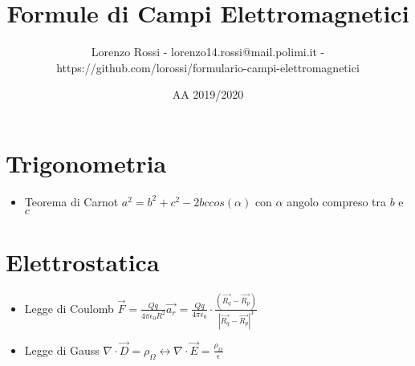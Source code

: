 \documentclass{article}
\title{Formule di Campi Elettromagnetici}
\author{Lorenzo Rossi - lorenzo14.rossi@mail.polimi.it - https://github.com/lorossi/formulario-campi-elettromagnetici}
\date{AA 2019/2020}
\begin{document}
\maketitle

\section{Trigonometria}
\begin{itemize}
	\item Teorema di Carnot \( a^2 = b^2 + c^2 - 2bccos(\alpha)\) con \(\alpha\) angolo compreso tra \(b\) e \(c\) 
\end{itemize}

\section{Elettrostatica}
\begin{itemize}
	\item Legge di Coulomb \( \vec{F} = \frac{Qq}{4 \pi \epsilon_0 R^2} \vec{a_r} = \frac{Qq}{4 \pi \epsilon_0} \cdot \frac{(\vec{R_q} - \vec{R_p})}{| \vec{R_q} - \vec{R_p} | ^3 } \)
	\item Legge di Gauss \( \nabla \cdot \vec{D} = \rho_\Omega \leftrightarrow \nabla \cdot \vec{E} = \frac{\rho_\Omega}{\epsilon} \)
\end{itemize}
\end{document}
